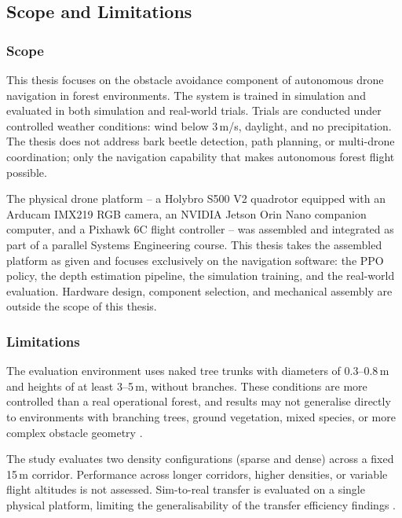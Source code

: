 \documentclass[../main.tex]{subfiles}
\begin{document}
\subsection{Scope and Limitations}

\subsubsection{Scope}

This thesis focuses on the obstacle avoidance component of autonomous drone navigation in forest environments. The system is trained in simulation and evaluated in both simulation and real-world trials. Trials are conducted under controlled weather conditions: wind below 3\,m/s, daylight, and no precipitation. The thesis does not address bark beetle detection, path planning, or multi-drone coordination; only the navigation capability that makes autonomous forest flight possible.

The physical drone platform -- a Holybro S500 V2 quadrotor equipped with an Arducam IMX219 RGB camera, an NVIDIA Jetson Orin Nano companion computer, and a Pixhawk 6C flight controller -- was assembled and integrated as part of a parallel Systems Engineering course. This thesis takes the assembled platform as given and focuses exclusively on the navigation software: the PPO policy, the depth estimation pipeline, the simulation training, and the real-world evaluation. Hardware design, component selection, and mechanical assembly are outside the scope of this thesis.

\subsubsection{Limitations}

The evaluation environment uses naked tree trunks with diameters of 0.3--0.8\,m and heights of at least 3--5\,m, without branches. These conditions are more controlled than a real operational forest, and results may not generalise directly to environments with branching trees, ground vegetation, mixed species, or more complex obstacle geometry \cite{Butt2024,Merei2025,Debnath2024}.

The study evaluates two density configurations (sparse and dense) across a fixed 15\,m corridor. Performance across longer corridors, higher densities, or variable flight altitudes is not assessed. Sim-to-real transfer is evaluated on a single physical platform, limiting the generalisability of the transfer efficiency findings \cite{Zhao2020,Salvato2021}.
\end{document}

